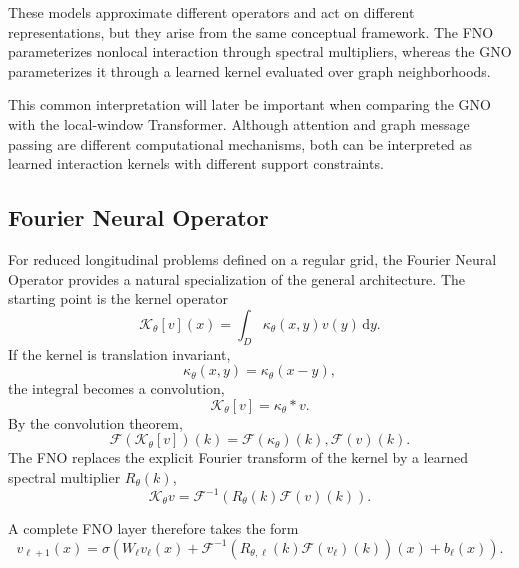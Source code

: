 \documentclass[11pt,a4paper]{article}
\providecommand{\dd}{\,\mathrm{d}}
\begin{document}
\begin{sloppypar}
These models approximate different operators and act on different representations, but they arise from the same conceptual framework. The FNO parameterizes nonlocal interaction through spectral multipliers, whereas the GNO parameterizes it through a learned kernel evaluated over graph neighborhoods.

This common interpretation will later be important when comparing the GNO with the local-window Transformer. Although attention and graph message passing are different computational mechanisms, both can be interpreted as learned interaction kernels with different support constraints.

\subsection{Fourier Neural Operator}
\label{subsec:fourier_neural_operator}

For reduced longitudinal problems defined on a regular grid, the Fourier Neural Operator provides a natural specialization of the general architecture. The starting point is the kernel operator
\begin{equation}
\mathcal{K}_{\theta}[v](x)
=
\int_D
\kappa_{\theta}(x,y)
v(y)
\dd y.
\end{equation}
If the kernel is translation invariant,
\begin{equation}
\kappa_{\theta}(x,y)
=
\kappa_{\theta}(x-y),
\end{equation}
the integral becomes a convolution,
\begin{equation}
\mathcal{K}_{\theta}[v]
=
\kappa_{\theta}*v.
\end{equation}
By the convolution theorem,
\begin{equation}
\mathcal{F}
\left(
\mathcal{K}_{\theta}[v]
\right)(k)
=
\mathcal{F}
(\kappa_{\theta})(k)
,
\mathcal{F}(v)(k).
\end{equation}
The FNO replaces the explicit Fourier transform of the kernel by a learned spectral multiplier
$R_{\theta}(k)$,
\begin{equation}
\mathcal{K}_{\theta}v
=
\mathcal{F}^{-1}
\left(
R_{\theta}(k)
\mathcal{F}(v)(k)
\right).
\label{eq:fno_core_revised}
\end{equation}

A complete FNO layer therefore takes the form
\begin{equation}
v_{\ell+1}(x)
=
\sigma
\left(
W_{\ell}v_{\ell}(x)
+
\mathcal{F}^{-1}
\left(
R_{\theta,\ell}(k)
\mathcal{F}(v_{\ell})(k)
\right)(x)
+
b_{\ell}(x)
\right).
\label{eq:fno_layer_revised}
\end{equation}


\end{sloppypar}
\end{document}
